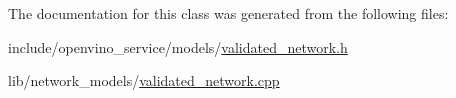 The documentation for this class was generated from the following files\+:\begin{DoxyCompactItemize}
\item 
include/openvino\+\_\+service/models/\hyperlink{validated__network_8h}{validated\+\_\+network.\+h}\item 
lib/network\+\_\+models/\hyperlink{validated__network_8cpp}{validated\+\_\+network.\+cpp}\end{DoxyCompactItemize}
